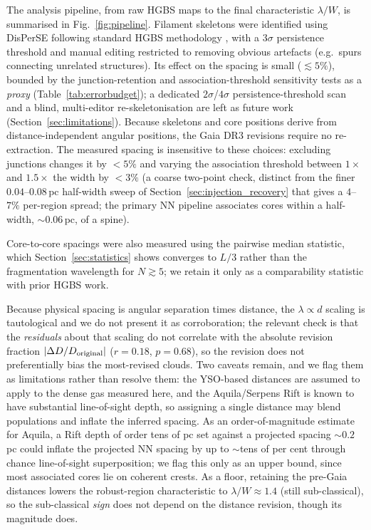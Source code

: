\documentclass[usenatbib,twoside,twocolumn]{mnras}
\begin{document}
The analysis pipeline, from raw HGBS maps to the final characteristic $\lambda/W$, is summarised in Fig.~\ref{fig:pipeline}. Filament skeletons were identified using DisPerSE \citep{Sousbie2011} following standard HGBS methodology \citep{Arzoumanian2011}, with a $3\sigma$ persistence threshold and manual editing restricted to removing obvious artefacts (e.g.\ spurs connecting unrelated structures). Its effect on the spacing is small ($\lesssim5\%$), bounded by the junction-retention and association-threshold sensitivity tests as a \emph{proxy} (Table~\ref{tab:errorbudget}); a dedicated $2\sigma$/$4\sigma$ persistence-threshold scan and a blind, multi-editor re-skeletonisation are left as future work (Section~\ref{sec:limitations}). Because skeletons and core positions derive from distance-independent angular positions, the Gaia DR3 revisions require no re-extraction. The measured spacing is insensitive to these choices: excluding junctions changes it by $<5\%$ and varying the association threshold between $1\times$ and $1.5\times$ the width by $<3\%$ (a coarse two-point check, distinct from the finer $0.04$--$0.08$\,pc half-width sweep of Section~\ref{sec:injection_recovery} that gives a $4$--$7\%$ per-region spread; the primary NN pipeline associates cores within a half-width, $\sim0.06$\,pc, of a spine).

Core-to-core spacings were also measured using the pairwise median statistic, which Section~\ref{sec:statistics} shows converges to $L/3$ rather than the fragmentation wavelength for $N\gtrsim5$; we retain it only as a comparability statistic with prior HGBS work.

Because physical spacing is angular separation times distance, the $\lambda\propto d$ scaling is tautological and we do not present it as corroboration; the relevant check is that the \emph{residuals} about that scaling do not correlate with the absolute revision fraction $|\Delta D/D_{\rm original}|$ ($r=0.18$, $p=0.68$), so the revision does not preferentially bias the most-revised clouds. Two caveats remain, and we flag them as limitations rather than resolve them: the YSO-based distances \citep{Zhang2023} are assumed to apply to the dense gas measured here, and the Aquila/Serpens Rift is known to have substantial line-of-sight depth, so assigning a single distance may blend populations and inflate the inferred spacing. As an order-of-magnitude estimate for Aquila, a Rift depth of order tens of pc set against a projected spacing $\sim0.2$\,pc could inflate the projected NN spacing by up to $\sim$tens of per cent through chance line-of-sight superposition; we flag this only as an upper bound, since most associated cores lie on coherent crests. As a floor, retaining the pre-Gaia distances lowers the robust-region characteristic to $\lambda/W\approx1.4$ (still sub-classical), so the sub-classical \emph{sign} does not depend on the distance revision, though its magnitude does.
\end{document}
